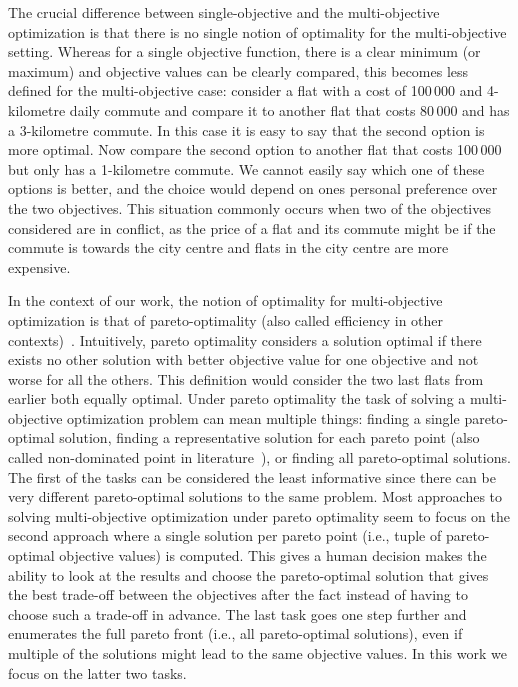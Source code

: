 The crucial difference between single-objective and the multi-objective optimization is that there is no single notion of optimality for the multi-objective setting.
Whereas for a single objective function, there is a clear minimum (or maximum) and objective values can be clearly compared, this becomes less defined for the multi-objective case:
consider a flat with a cost of 100\,000 \texteuro{} and 4-kilometre daily commute and compare it to another flat that costs 80\,000 \texteuro{} and has a 3-kilometre commute.
In this case it is easy to say that the second option is more optimal.
Now compare the second option to another flat that costs 100\,000 \texteuro{} but only has a 1-kilometre commute.
We cannot easily say which one of these options is better, and the choice would depend on ones personal preference over the two objectives.
This situation commonly occurs when two of the objectives considered are in conflict, as the price of a flat and its commute might be if the commute is towards the city centre and flats in the city centre are more expensive.

In the context of our work, the notion of optimality for multi-objective optimization is that of pareto-optimality (also called efficiency in other contexts)~\autocite{Ehrgott2005-2}.
Intuitively, pareto optimality considers a solution optimal if there exists no other solution with better objective value for one objective and not worse for all the others. 
This definition would consider the two last flats from earlier both equally optimal.
Under pareto optimality the task of solving a multi-objective optimization problem can mean multiple things:
finding a single pareto-optimal solution, finding a representative solution for each pareto point (also called non-dominated point in literature~\autocite{Ehrgott2005-2}), or finding all pareto-optimal solutions.
The first of the tasks can be considered the least informative since there can be very different pareto-optimal solutions to the same problem.
Most approaches to solving multi-objective optimization under pareto optimality seem to focus on the second approach where a single solution per pareto point (i.e., tuple of pareto-optimal objective values) is computed.
This gives a human decision makes the ability to look at the results and choose the pareto-optimal solution that gives the best trade-off between the objectives after the fact instead of having to choose such a trade-off in advance.
The last task goes one step further and enumerates the full pareto front (i.e., all pareto-optimal solutions), even if multiple of the solutions might lead to the same objective values.
In this work we focus on the latter two tasks.

